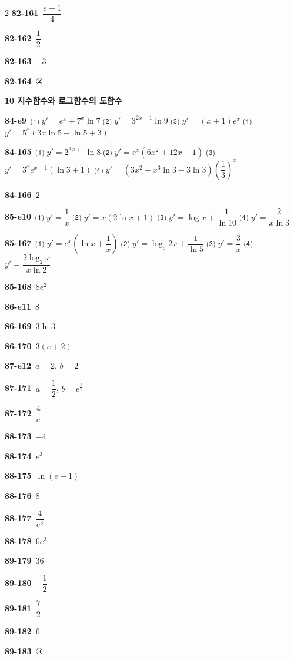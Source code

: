 \documentclass[10pt,a4paper]{article}
\begin{document}
\begin{multicols}{2}
\noindent\textbf{82-161}\ $\dfrac{e-1}{4}$\par
\noindent\textbf{82-162}\ $\dfrac{1}{2}$\par
\noindent\textbf{82-163}\ $-3$\par
\noindent\textbf{82-164}\ ②\par
\noindent\textbf{10 지수함수와 로그함수의 도함수}\par\smallskip
\noindent\textbf{84-e9}\ ⑴ $y'=e^x+7^x\ln 7$ ⑵ $y'=3^{2x-1}\ln 9$ ⑶ $y'=(x+1)e^x$ ⑷ $y'=5^x(3x\ln 5-\ln 5+3)$\par
\noindent\textbf{84-165}\ ⑴ $y'=2^{3x+1}\ln 8$ ⑵ $y'=e^x(6x^2+12x-1)$ ⑶ $y'=3^xe^{x+1}(\ln 3+1)$ ⑷ $y'=(3x^2-x^3\ln 3-3\ln 3)\left(\dfrac{1}{3}\right)^x$\par
\noindent\textbf{84-166}\ $2$\par
\noindent\textbf{85-e10}\ ⑴ $y'=\dfrac{1}{x}$ ⑵ $y'=x(2\ln x+1)$ ⑶ $y'=\log x+\dfrac{1}{\ln 10}$ ⑷ $y'=\dfrac{2}{x\ln 3}$\par
\noindent\textbf{85-167}\ ⑴ $y'=e^x\left(\ln x+\dfrac{1}{x}\right)$ ⑵ $y'=\log_5 2x+\dfrac{1}{\ln 5}$ ⑶ $y'=\dfrac{3}{x}$ ⑷ $y'=\dfrac{2\log_2 x}{x\ln 2}$\par
\noindent\textbf{85-168}\ $8e^2$\par
\noindent\textbf{86-e11}\ $8$\par
\noindent\textbf{86-169}\ $3\ln 3$\par
\noindent\textbf{86-170}\ $3(e+2)$\par
\noindent\textbf{87-e12}\ $a=2$, $b=2$\par
\noindent\textbf{87-171}\ $a=\dfrac{1}{2}$, $b=e^{\frac{3}{2}}$\par
\noindent\textbf{87-172}\ $\dfrac{4}{e}$\par
\noindent\textbf{88-173}\ $-4$\par
\noindent\textbf{88-174}\ $e^3$\par
\noindent\textbf{88-175}\ $\ln(e-1)$\par
\noindent\textbf{88-176}\ $8$\par
\noindent\textbf{88-177}\ $\dfrac{4}{e^3}$\par
\noindent\textbf{88-178}\ $6e^3$\par
\noindent\textbf{89-179}\ $36$\par
\noindent\textbf{89-180}\ $-\dfrac{1}{2}$\par
\noindent\textbf{89-181}\ $\dfrac{7}{2}$\par
\noindent\textbf{89-182}\ $6$\par
\noindent\textbf{89-183}\ ③\par

\end{multicols}
\end{document}
